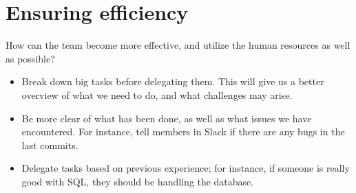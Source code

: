 \documentclass{article}
\begin{document}
\section*{Ensuring efficiency}
How can the team become more effective, and utilize the human resources as well as possible?
\begin{itemize}
	\item Break down big tasks before delegating them. This will give us a better overview of what we need to do, and what challenges may arise.
	\item Be more clear of what has been done, as well as what issues we have encountered. For instance, tell members in Slack if there are any bugs in the last commits.
	\item Delegate tasks based on previous experience; for instance, if someone is really good with SQL, they should be handling the database.
\end{itemize}
\end{document}
